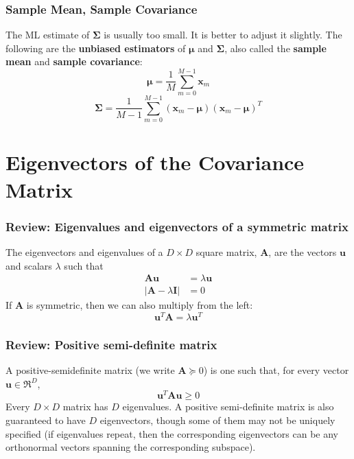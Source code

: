 \documentclass{beamer}
\begin{document}
\begin{frame}
  \frametitle{Sample Mean, Sample Covariance}
  The ML estimate of $\bm{\Sigma}$ is usually too small.  It is better
  to adjust it slightly.  The following are the {\bf unbiased
    estimators} of $\bm{\mu}$ and $\bm{\Sigma}$, also called the {\bf
    sample mean} and {\bf sample covariance}:
  \[
  \bm{\mu}=\frac{1}{M}\sum_{m=0}^{M-1}\mathbf{x}_m
  \]
  \[
  \bm{\Sigma}=\frac{1}{M-1}\sum_{m=0}^{M-1}(\mathbf{x}_m-\bm{\mu})(\mathbf{x}_m-\bm{\mu})^T
  \]
\end{frame}

\section[Eigenvectors]{Eigenvectors of the Covariance Matrix}
\setcounter{subsection}{1}


\begin{frame}
  \frametitle{Review: Eigenvalues and eigenvectors of a symmetric matrix}

  The eigenvectors and eigenvalues of a $D\times D$ square matrix,
  $\mathbf{A}$, are the vectors $\mathbf{u}$ and scalars $\lambda$
  such that
  \begin{align*}
    \mathbf{A}\mathbf{u}&=\lambda\mathbf{u}\\
    |\mathbf{A}-\lambda \mathbf{I}|&=0
  \end{align*}
  If $\mathbf{A}$ is symmetric, then we can also multiply from the left:
  \[
  \mathbf{u}^T \mathbf{A} = \lambda\mathbf{u}^T
  \]
\end{frame}

\begin{frame}
  \frametitle{Review: Positive semi-definite matrix}

  A positive-semidefinite matrix (we write $\mathbf{A}\succcurlyeq 0$)
  is one such that, for every vector $\mathbf{u}\in\Re^D$,
  \begin{displaymath}
    \mathbf{u}^T\mathbf{A}\mathbf{u} \ge 0
  \end{displaymath}
  Every $D\times D$ matrix has $D$ eigenvalues.  A positive
  semi-definite matrix is also guaranteed to have $D$ eigenvectors,
  though some of them may not be uniquely specified (if eigenvalues
  repeat, then the corresponding eigenvectors can be any orthonormal
  vectors spanning the corresponding subspace).
\end{frame}
\end{document}

